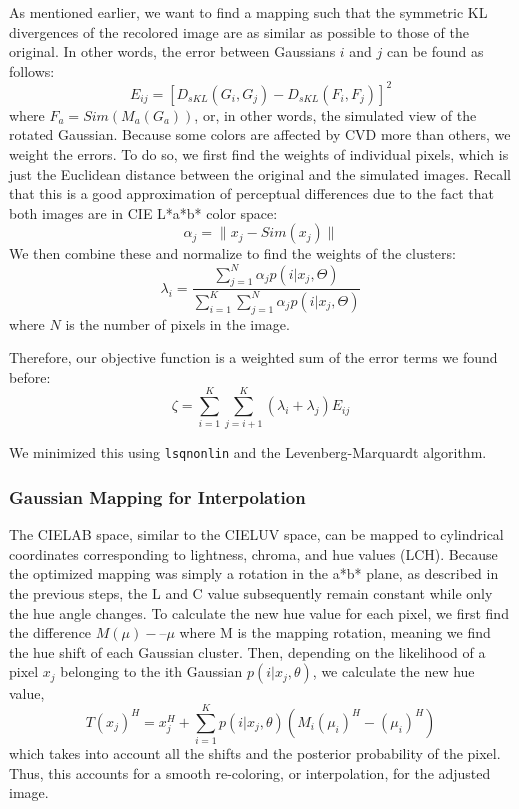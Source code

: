 \documentclass[10pt,twocolumn,letterpaper]{article}
\begin{document}
As mentioned earlier, we want to find a mapping such that the symmetric KL divergences of the recolored image are as similar as possible to those of the original. In other words, the error between Gaussians $i$ and $j$ can be found as follows: 
\[
  E_{ij} = [D_{sKL}(G_i, G_j) - D_{sKL}(F_i, F_j)]^2
\]
where $F_a = Sim(M_a(G_a))$, or, in other words, the simulated view of the rotated Gaussian. Because some colors are affected by CVD more than others, we weight the errors. To do so, we first find the weights of individual pixels, which is just the Euclidean distance between the original and the simulated images. Recall that this is a good approximation of perceptual differences due to the fact that both images are in CIE L*a*b* color space: 
\[
  \alpha_j = \| x_j - Sim(x_j) \|
\]
We then combine these and normalize to find the weights of the clusters:
\[
  \lambda_i = \frac{\sum_{j=1}^N \alpha_j p(i | x_j, \Theta)}{\sum_{i=1}^K \sum_{j=1}^N \alpha_j p(i | x_j, \Theta)}
\]
where $N$ is the number of pixels in the image. 

Therefore, our objective function is a weighted sum of the error terms we found before:
\[
  \zeta = \sum_{i=1}^K \sum_{j=i+1}^K (\lambda_i + \lambda_j) E_{ij}
\]

We minimized this using \texttt{lsqnonlin} and the Levenberg-Marquardt algorithm. 

\subsubsection{Gaussian Mapping for Interpolation}

The CIELAB space, similar to the CIELUV space, can be mapped to cylindrical coordinates corresponding to lightness, chroma, and hue values (LCH). Because the optimized mapping was simply a rotation in the a*b* plane, as described in the previous steps, the L and C value subsequently remain constant while only the hue angle changes. To calculate the new hue value for each pixel, we first find the difference $M(\mu) -– \mu$ where M is the mapping rotation, meaning we find the hue shift of each Gaussian cluster. Then, depending on the likelihood of a pixel $x_j$ belonging to the ith Gaussian $p(i|x_j, \theta)$, we calculate the new hue value, 
\[
  T(x_j)^{H} = x_j^{H} + \sum\limits_{i=1}^K p(i|x_j, \theta)(M_i(\mu_i)^{H}-(\mu_i)^{H})
\]
which takes into account all the shifts and the posterior probability of the pixel.  Thus, this accounts for a smooth re-coloring, or interpolation, for the adjusted image. 
\end{document}

